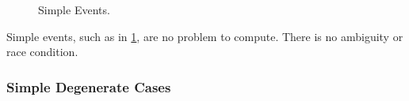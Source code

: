 \documentclass[12pt,a4paper,oneside,openany]{article}
\begin{document}
\begin{figure}[htpb]
\begin{center}
\caption{Simple Events.}
\label{fig:simpleevents}
\end{center}
\end{figure}

Simple events, such as in \cref{fig:simpleevents}, are no problem to compute. There is no ambiguity or race condition.


\subsubsection{Simple Degenerate Cases}
\end{document}
